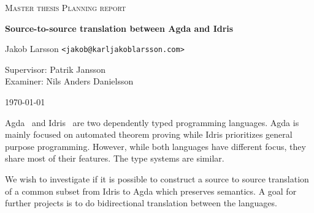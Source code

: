 \documentclass{scrartcl}
\begin{document}
\begin{titlepage}

\centering
{\scshape\LARGE Master thesis Planning report}


\vspace{0.5cm}
{\huge\bfseries Source-to-source translation between Agda and Idris
  }

\vspace{2cm}
{\Large Jakob Larsson \texttt{<jakob@karljakoblarsson.com>}}

\vspace{1.0cm}
{\large Supervisor: Patrik Jansson  \\
        Examiner: Nils Anders Danielsson}

\vspace{1.5cm}

\vfill
{\large \today}

\end{titlepage}

%
%




Agda~\cite{agda} and Idris~\cite{idris} are two dependently typed programming
languages.  Agda is mainly focused on automated theorem proving while Idris
prioritizes general purpose programming.  However, while both languages have
different focus, they share most of their features. The type systems are
similar.



We wish to investigate if it is possible to construct a source to source
translation of a common subset from Idris to Agda which preserves semantics.
A goal for further projects is to do bidirectional translation between the
languages.
\end{document}

